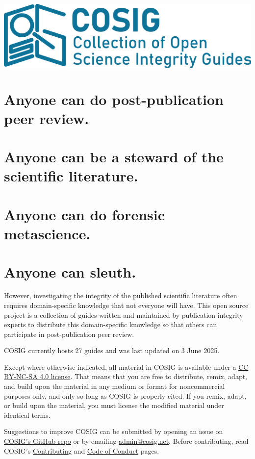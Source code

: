 \documentclass[letterpaper, 12pt]{article}
\begin{document}
\flushleft
\includegraphics[width=\textwidth]{img/home/241017_final_logo_mockup.png}

\section*{Anyone can do post-publication peer review.}
\section*{Anyone can be a steward of the scientific literature.}
\section*{Anyone can do forensic metascience.}
\section*{Anyone can sleuth.}

However, investigating the integrity of the published scientific literature often requires domain-specific knowledge that not everyone will have. This open source project is a collection of guides written and maintained by publication integrity experts to distribute this domain-specific knowledge so that others can participate in post-publication peer review.

COSIG currently hosts 27 guides and was last updated on 3 June 2025.

Except where otherwise indicated, all material in COSIG is available under a \href{https://creativecommons.org/licenses/by-nc-sa/4.0/deed.en}{CC BY-NC-SA 4.0 license}. That means that you are free to distribute, remix, adapt, and build upon the material in any medium or format for noncommercial purposes only, and only so long as COSIG is properly cited. If you remix, adapt, or build upon the material, you must license the modified material under identical terms.

Suggestions to improve COSIG can be submitted by opening an issue on \href{https://github.com/cosig-pppr/cosig/issues}{COSIG's GitHub repo} or by emailing \href{mailto:admin@cosig.net}{admin@cosig.net}. Before contributing, read COSIG's \href{https://github.com/cosig-pppr/cosig/blob/main/CONTRIBUTING.md}{Contributing} and \href{https://github.com/cosig-pppr/cosig/blob/main/CODE_OF_CONDUCT.md}{Code of Conduct} pages.
\end{document}
